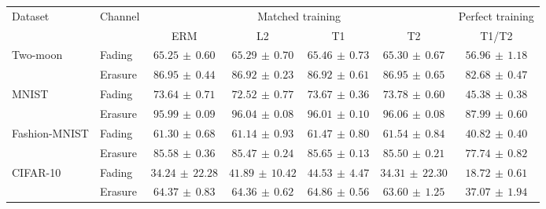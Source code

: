 \begin{tabular*}{\linewidth}{@{\extracolsep{\fill}}llccccc@{}}
\toprule
\multirow{2}{*}{Dataset} & \multirow{2}{*}{Channel} & \multicolumn{4}{c}{Matched training} & Perfect training \\
\cmidrule(lr){3-6}\cmidrule(l){7-7}
 & & ERM & L2 & T1 & T2 & T1/T2 \\
\midrule
\multirow{2}{*}{Two-moon} & Fading & $65.25\,\pm\,0.60$ & $65.29\,\pm\,0.70$ & $\mathbf{65.46}\,\pm\,0.73$ & $65.30\,\pm\,0.67$ & $56.96\,\pm\,1.18$ \\
 & Erasure & $86.95\,\pm\,0.44$ & $86.92\,\pm\,0.23$ & $86.92\,\pm\,0.61$ & $\mathbf{86.95}\,\pm\,0.65$ & $82.68\,\pm\,0.47$ \\
\midrule[0.25pt]
\multirow{2}{*}{MNIST} & Fading & $73.64\,\pm\,0.71$ & $72.52\,\pm\,0.77$ & $73.67\,\pm\,0.36$ & $\mathbf{73.78}\,\pm\,0.60$ & $45.38\,\pm\,0.38$ \\
 & Erasure & $95.99\,\pm\,0.09$ & $96.04\,\pm\,0.08$ & $96.01\,\pm\,0.10$ & $\mathbf{96.06}\,\pm\,0.08$ & $87.99\,\pm\,0.60$ \\
\midrule[0.25pt]
\multirow{2}{*}{Fashion-MNIST} & Fading & $61.30\,\pm\,0.68$ & $61.14\,\pm\,0.93$ & $61.47\,\pm\,0.80$ & $\mathbf{61.54}\,\pm\,0.84$ & $40.82\,\pm\,0.40$ \\
 & Erasure & $85.58\,\pm\,0.36$ & $85.47\,\pm\,0.24$ & $\mathbf{85.65}\,\pm\,0.13$ & $85.50\,\pm\,0.21$ & $77.74\,\pm\,0.82$ \\
\midrule[0.25pt]
\multirow{2}{*}{CIFAR-10} & Fading & $34.24\,\pm\,22.28$ & $41.89\,\pm\,10.42$ & $\mathbf{44.53}\,\pm\,4.47$ & $34.31\,\pm\,22.30$ & $18.72\,\pm\,0.61$ \\
 & Erasure & $64.37\,\pm\,0.83$ & $64.36\,\pm\,0.62$ & $\mathbf{64.86}\,\pm\,0.56$ & $63.60\,\pm\,1.25$ & $37.07\,\pm\,1.94$ \\
\bottomrule
\end{tabular*}
